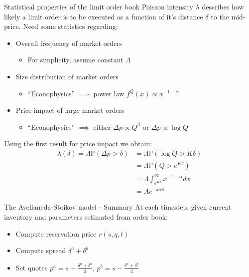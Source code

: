 \documentclass{beamer} %
\begin{document}
\begin{frame}{Statistical properties of the limit order book}
    Poisson intensity $\lambda$ describes how likely a limit order is to be executed as a function of it's 
    distance $\delta$ to the mid-price. Need some statistics regarding:
    \begin{itemize}
        \item Overall frequency of market orders
        \begin{itemize}
            \item For simplicity, assume constant $\Lambda$
        \end{itemize}
        \item Size distribution of market orders
        \begin{itemize}
            \item ``Econophysics'' $\implies$ power law $f^Q(x)\propto x^{-1-\alpha}$
        \end{itemize}
        \item Price impact of large market orders
        \begin{itemize}
            \item ``Econophysics'' $\implies$ either $\Delta p\propto Q^\beta$ or $\Delta p\propto\log Q$
        \end{itemize}
    \end{itemize}
    Using the first result for price impact we obtain:
    \begin{align*}
        \lambda(\delta)=\Lambda\mathbb{P}(\Delta p>\delta)&=\Lambda\mathbb{P}(\log Q>K\delta)\\
        &=\Lambda\mathbb{P}\left(Q>e^{K\delta}\right)\\
        &=\Lambda\int_{e^{K\delta}}^{\infty}x^{-1-\alpha}dx\\
        &=Ae^{-k\alpha\delta}
    \end{align*}
\end{frame}

\begin{frame}{The Avellaneda-Stoikov model - Summary}
    At each timestep, given current inventory and parameters estimated from order book:
    \begin{itemize}
        \item Compute reservation price $r(s,q,t)$
        \item Compute spread $\delta^a+\delta^b$
        \item Set quotes $p^a=s+\frac{\delta^a+\delta^b}{2}$, $p^b=s-\frac{\delta^a+\delta^b}{2}$
    \end{itemize}
\end{frame}
\end{document}
